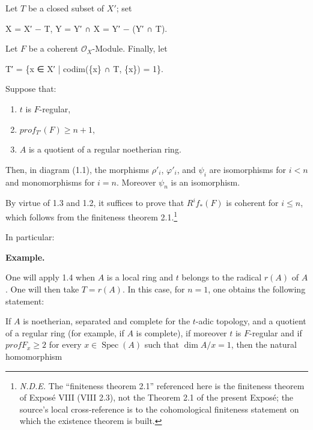 \documentclass[
  11pt,
  a4paper,
]{book}
\newenvironment{Shaded}{}{}
\newcommand{\NormalTok}[1]{#1}
\begin{document}
Let \(T\) be a closed subset of \(X'\); set

\begin{Shaded}
\begin{Highlighting}[]
\NormalTok{X = X′ − T,    Y = Y′ ∩ X = Y′ − (Y′ ∩ T).}
\end{Highlighting}
\end{Shaded}

Let \(F\) be a coherent \(\mathcal{O}_{X}\)-Module. Finally, let

\begin{Shaded}
\begin{Highlighting}[]
\NormalTok{T′ = \{x ∈ X′ | codim(\{x\} ∩ T, \{x\}) = 1\}.}
\end{Highlighting}
\end{Shaded}

Suppose that:

\begin{enumerate}
\def\labelenumi{\alph{enumi})}
\item
  \(t\) is \(F\)-regular,
\item
  \(prof_{T'}(F) \geqslant n + 1\),
\item
  \(A\) is a quotient of a regular noetherian ring.
\end{enumerate}

Then, in diagram (1.1), the morphisms \(\rho'_{i}\), \(\varphi'_{i}\),
and \(\psi_{i}\) are isomorphisms for \(i < n\) and monomorphisms for
\(i = n\). Moreover \(\psi_{n}\) is an isomorphism.

By virtue of 1.3 and 1.2, it suffices to prove that \(R^{i} f_{*}(F)\)
is coherent for \(i \leqslant n\), which follows from the finiteness
theorem 2.1.\footnote{\emph{N.D.E.} The ``finiteness theorem 2.1''
  referenced here is the finiteness theorem of Exposé VIII (VIII 2.3),
  not the Theorem 2.1 of the present Exposé; the source's local
  cross-reference is to the cohomological finiteness statement on which
  the existence theorem is built.}

In particular:

\textbf{Example.}

One will apply 1.4 when \(A\) is a local ring and \(t\) belongs to the
radical \(r(A)\) of \(A\). One will then take \(T =
{r(A)}\). In this case, for \(n = 1\), one obtains the following
statement:

If \(A\) is noetherian, separated and complete for the \(t\)-adic
topology, and a quotient of a regular ring (for example, if \(A\) is
complete), if moreover \(t\) is \(F\)-regular and if
\(prof F_{x} \geqslant 2\) for every \(x \in
\operatorname{Spec}(A)\) such that \(\dim A/x = 1\), then the natural
homomorphism
\end{document}
